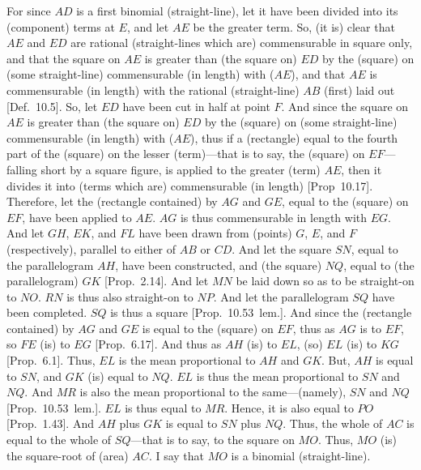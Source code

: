 For since $AD$ is a first binomial (straight-line), let it have been divided
into its (component) terms at $E$, and let $AE$ be the greater term.
So, (it is) clear that $AE$ and $ED$ are rational (straight-lines which are)
commensurable in square only, and that the square on $AE$ is greater
than (the square on) $ED$ by the (square) on (some straight-line)
commensurable (in length) with ($AE$), and that $AE$ is commensurable 
(in length) with
the rational (straight-line) $AB$ (first) laid out [Def.~10.5]. So, let $ED$ have been cut in half
at  point $F$. And since the square on $AE$ is greater than (the square on)
$ED$ by the (square) on (some straight-line) commensurable (in length) with ($AE$),
thus if a (rectangle) equal to the fourth part of the (square) on the lesser (term)---that is to say, the (square) on $EF$---falling short by a square figure,
is applied to the greater (term) $AE$, then it divides it into (terms which are)
commensurable (in length) [Prop~10.17]. 
Therefore, let the (rectangle contained) by $AG$ and $GE$, equal to
the (square) on $EF$, have been applied to $AE$. $AG$ 
is thus commensurable in length with $EG$. And let $GH$, $EK$, and $FL$
have been drawn from (points) $G$, $E$, and $F$ (respectively), parallel to
either of $AB$ or $CD$. And let the square $SN$, equal to the
parallelogram $AH$, have been constructed, and (the square) $NQ$,
equal to (the parallelogram) $GK$ [Prop.~2.14].
And let $MN$ be laid down so as to be straight-on to $NO$. $RN$
is thus also straight-on to $NP$. And let the parallelogram $SQ$ have
been completed. $SQ$ is thus a square [Prop.~10.53~lem.].  And since the (rectangle
contained) by $AG$ and $GE$ is equal to the (square) on $EF$, thus as
$AG$ is to $EF$, so $FE$ (is) to $EG$ [Prop.~6.17]. And thus as $AH$ (is) to
$EL$, (so) $EL$ (is) to $KG$ [Prop.~6.1]. Thus,
$EL$ is the mean proportional to $AH$ and $GK$. But, $AH$ is equal to
$SN$, and $GK$ (is) equal to $NQ$. $EL$ is thus the mean proportional
to $SN$ and $NQ$. And $MR$ is also the mean proportional to the
same---(namely), $SN$ and $NQ$ [Prop.~10.53~lem.]. $EL$ is thus equal to $MR$.
Hence, it is also equal to $PO$ [Prop.~1.43]. And
$AH$ plus $GK$ is equal to $SN$ plus $NQ$. Thus, the whole of $AC$
is equal to the whole of $SQ$---that is to say, to the square on $MO$.
Thus, $MO$ (is) the square-root of (area) $AC$.  I say that $MO$ is a
binomial (straight-line).

